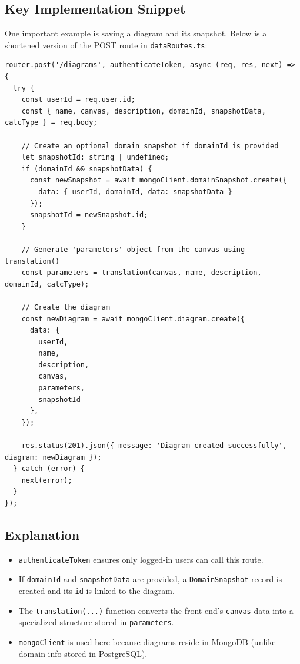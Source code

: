 \documentclass{article}
\begin{document}
\subsection{Key Implementation Snippet}
One important example is saving a diagram and its snapshot. Below is a shortened version of the POST route in \texttt{dataRoutes.ts}:

\begin{verbatim}
router.post('/diagrams', authenticateToken, async (req, res, next) => {
  try {
    const userId = req.user.id;
    const { name, canvas, description, domainId, snapshotData, calcType } = req.body;

    // Create an optional domain snapshot if domainId is provided
    let snapshotId: string | undefined;
    if (domainId && snapshotData) {
      const newSnapshot = await mongoClient.domainSnapshot.create({
        data: { userId, domainId, data: snapshotData }
      });
      snapshotId = newSnapshot.id;
    }

    // Generate 'parameters' object from the canvas using translation()
    const parameters = translation(canvas, name, description, domainId, calcType);

    // Create the diagram
    const newDiagram = await mongoClient.diagram.create({
      data: {
        userId,
        name,
        description,
        canvas,
        parameters,
        snapshotId
      },
    });

    res.status(201).json({ message: 'Diagram created successfully', diagram: newDiagram });
  } catch (error) {
    next(error);
  }
});
\end{verbatim}

\subsection{Explanation}
\begin{itemize}
  \item \texttt{authenticateToken} ensures only logged-in users can call this route.
  \item If \texttt{domainId} and \texttt{snapshotData} are provided, a \texttt{DomainSnapshot} record is created and its \texttt{id} is linked to the diagram.
  \item The \texttt{translation(...)} function converts the front-end’s \texttt{canvas} data into a specialized structure stored in \texttt{parameters}.
  \item \texttt{mongoClient} is used here because diagrams reside in MongoDB (unlike domain info stored in PostgreSQL).
\end{itemize}
\end{document}
